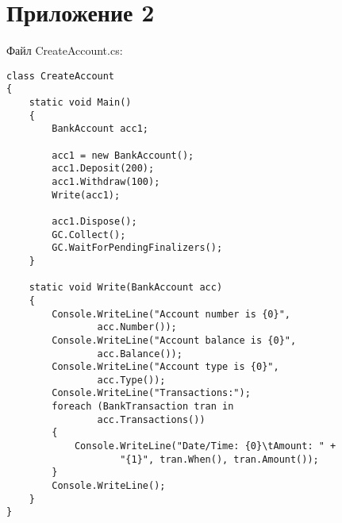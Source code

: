 \chapter*{Приложение 2}

Файл CreateAccount.cs:
\begin{lstlisting}[style=CSharpStyle]
class CreateAccount
{
    static void Main() 
    {
        BankAccount acc1;

        acc1 = new BankAccount();
        acc1.Deposit(200);
        acc1.Withdraw(100);
        Write(acc1);

        acc1.Dispose();
        GC.Collect();
        GC.WaitForPendingFinalizers();
    }
      
    static void Write(BankAccount acc)
    {
        Console.WriteLine("Account number is {0}",
                acc.Number());
        Console.WriteLine("Account balance is {0}", 
                acc.Balance());
        Console.WriteLine("Account type is {0}",
                acc.Type());
		Console.WriteLine("Transactions:");
		foreach (BankTransaction tran in 
                acc.Transactions()) 
		{
			Console.WriteLine("Date/Time: {0}\tAmount: " +
                    "{1}", tran.When(), tran.Amount());
		}
        Console.WriteLine();
    }
}
\end{lstlisting}  

